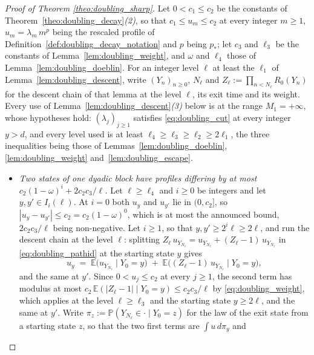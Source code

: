 \begin{proof}[Proof of Theorem \ref{theo:doubling_sharp}]
Let $0<c_1\leq c_2$ be the constants of Theorem~\ref{theo:doubling_decay}\emph{(2)}, so that
$c_1\leq u_m\leq c_2$ at every integer $m\geq1$, $u_m=\lambda_m\,m^{p}$ being the rescaled
profile of Definition~\ref{def:doubling_decay_notation} and $p$ being $p_*$; let $c_3$ and
$\ell_3$ be the constants of Lemma~\ref{lem:doubling_weight}, and $\omega$ and $\ell_4$ those
of Lemma~\ref{lem:doubling_doeblin}. For an integer level $\ell$ at least the $\ell_1$ of
Lemma~\ref{lem:doubling_descent}, write $(Y_n)_{n\geq0}$, $N_\ell$ and
$Z_\ell:=\prod_{n<N_\ell}R_0(Y_n)$ for the descent chain of that lemma at the level $\ell$, its
exit time and its weight. Every use of Lemma~\ref{lem:doubling_descent}\emph{(3)} below is at
the range $M_1=+\infty$, whose hypotheses hold: $(\lambda_j)_{j\geq1}$ satisfies
\eqref{eq:doubling_cut} at every integer $y>d$, and every level used is at least
$\ell_4\geq\ell_3\geq\ell_2\geq2\ell_1$, the three inequalities being those of
Lemmas~\ref{lem:doubling_doeblin}, \ref{lem:doubling_weight} and~\ref{lem:doubling_escape}.
\begin{itemize}
    \item \emph{Two states of one dyadic block have profiles differing by at most
    $c_2(1-\omega)^{i}+2c_2c_3/\ell$.} Let $\ell\geq\ell_4$ and $i\geq0$ be integers and let
    $y,y'\in I_i(\ell)$. At $i=0$ both $u_y$ and $u_{y'}$ lie in $(0,c_2]$, so
    $|u_y-u_{y'}|\leq c_2=c_2(1-\omega)^{0}$, which is at most the announced bound,
    $2c_2c_3/\ell$ being non-negative. Let $i\geq1$, so that $y,y'\geq2^{i}\ell\geq2\ell$,
    and run the descent chain at the level $\ell$: splitting
    $Z_\ell\,u_{Y_{N_\ell}}=u_{Y_{N_\ell}}+(Z_\ell-1)\,u_{Y_{N_\ell}}$ in
    \eqref{eq:doubling_pathid} at the starting state $y$ gives
    \begin{equation}
        u_y\;=\;\mathbb E\bigl(u_{Y_{N_\ell}}\mid Y_0=y\bigr)
        \;+\;\mathbb E\bigl((Z_\ell-1)\,u_{Y_{N_\ell}}\mid Y_0=y\bigr),
    \end{equation}
    and the same at $y'$. Since $0<u_j\leq c_2$ at every $j\geq1$, the second term has modulus
    at most $c_2\,\mathbb E(|Z_\ell-1|\mid Y_0=y)\leq c_2c_3/\ell$ by
    \eqref{eq:doubling_weight}, which applies at the level $\ell\geq\ell_3$ and the starting
    state $y\geq2\ell$, and the same at $y'$. Write
    $\pi_z:=\mathbb P(Y_{N_\ell}\in\cdot\mid Y_0=z)$ for the law of the exit state from a
    starting state $z$, so that the two first terms are $\int u\,d\pi_y$ and

\end{itemize}
\end{proof}
